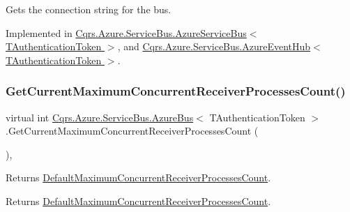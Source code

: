 Gets the connection string for the bus. 



Implemented in \hyperlink{classCqrs_1_1Azure_1_1ServiceBus_1_1AzureServiceBus_a5a3b3610dc5dfebe586262c0bc787748_a5a3b3610dc5dfebe586262c0bc787748}{Cqrs.\+Azure.\+Service\+Bus.\+Azure\+Service\+Bus$<$ T\+Authentication\+Token $>$}, and \hyperlink{classCqrs_1_1Azure_1_1ServiceBus_1_1AzureEventHub_a9855633b53ed1f67863ef9dffad0812c_a9855633b53ed1f67863ef9dffad0812c}{Cqrs.\+Azure.\+Service\+Bus.\+Azure\+Event\+Hub$<$ T\+Authentication\+Token $>$}.

\mbox{\label{classCqrs_1_1Azure_1_1ServiceBus_1_1AzureBus_adfed2926ff68eff521e8c64c02cca2a6_adfed2926ff68eff521e8c64c02cca2a6}} 
\subsubsection{\texorpdfstring{Get\+Current\+Maximum\+Concurrent\+Receiver\+Processes\+Count()}{GetCurrentMaximumConcurrentReceiverProcessesCount()}}
{\footnotesize\ttfamily virtual int \hyperlink{classCqrs_1_1Azure_1_1ServiceBus_1_1AzureBus}{Cqrs.\+Azure.\+Service\+Bus.\+Azure\+Bus}$<$ T\+Authentication\+Token $>$.Get\+Current\+Maximum\+Concurrent\+Receiver\+Processes\+Count (\begin{DoxyParamCaption}{ }\end{DoxyParamCaption})\hspace{0.3cm}{\ttfamily [protected]}, {\ttfamily [virtual]}}



Returns \hyperlink{classCqrs_1_1Azure_1_1ServiceBus_1_1AzureBus_a12c3d07b7ad1836e85a449e6adc8b5df_a12c3d07b7ad1836e85a449e6adc8b5df}{Default\+Maximum\+Concurrent\+Receiver\+Processes\+Count}. 

\begin{DoxyReturn}{Returns}
\hyperlink{classCqrs_1_1Azure_1_1ServiceBus_1_1AzureBus_a12c3d07b7ad1836e85a449e6adc8b5df_a12c3d07b7ad1836e85a449e6adc8b5df}{Default\+Maximum\+Concurrent\+Receiver\+Processes\+Count}.
\end{DoxyReturn}



